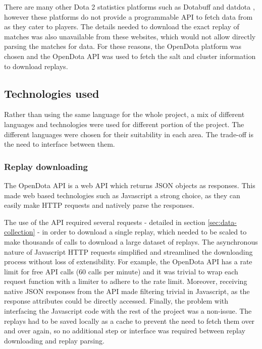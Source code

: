 \documentclass[Report.tex]{subfiles}
\begin{document}
There are many other Dota 2 statistics platforms such as Dotabuff \cite{dotabuff} and datdota \cite{datdota}, however these platforms do not provide a programmable API to fetch data from as they cater to players. The details needed to download the exact replay of matches was also unavailable from these websites, which would not allow directly parsing the matches for data. For these reasons, the OpenDota platform was chosen and the OpenDota API was used to fetch the salt and cluster information to download replays. 


\subsection{Technologies used}
Rather than using the same language for the whole project, a mix of different languages and technologies were used for different portion of the project. The different languages were chosen for their suitability in each area. The trade-off is the need to interface between them. 
\subsubsection{Replay downloading}
The OpenDota API is a web API which returns JSON objects as responses. This made web based technologies such as Javascript a strong choice, as they can easily make HTTP requests and natively parse the responses. 

The use of the API required several requests - detailed in section \ref{sec:data-collection} - in order to download a single replay, which needed to be scaled to make thousands of calls to download a large dataset of replays. The asynchronous nature of Javascript HTTP requests simplified and streamlined the downloading process without loss of extensibility. For example, the OpenDota API has a rate limit for free API calls (60 calls per minute) and it was trivial to wrap each request function with a limiter to adhere to the rate limit. Moreover, receiving native JSON responses from the API made filtering trivial in Javascript, as the response attributes could be directly accessed. Finally, the problem with interfacing the Javascript code with the rest of the project was a non-issue. The replays had to be saved locally as a cache to prevent the need to fetch them over and over again, so no additional step or interface was required between replay downloading and replay parsing. 

\end{document}
